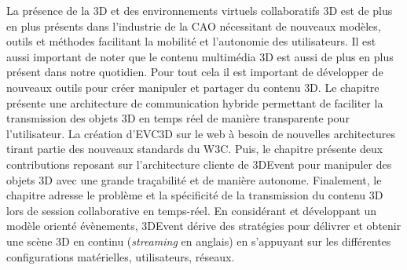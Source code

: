 La présence de la \gls{3D} et des environnements virtuels collaboratifs \gls{3D} est 
de plus en plus présents dans l'industrie de la \gls{CAO} nécessitant de nouveaux 
modèles, outils et méthodes facilitant la mobilité et l'autonomie des utilisateurs. Il 
est aussi important de noter que le contenu multimédia \gls{3D} est aussi de plus 
en plus présent dans notre quotidien. Pour tout cela il est important de développer 
de nouveaux outils pour créer manipuler et partager du contenu \gls{3D}.
Le chapitre  présente une architecture de communication hybride 
permettant de faciliter la transmission des objets \gls{3D} en temps réel de 
manière transparente pour l'utilisateur. La création d'\gls{EVC3D} sur le web à 
besoin de nouvelles architectures tirant partie des nouveaux standards du 
\gls{W3C}. Puis, le chapitre  présente deux  contributions reposant sur l'architecture cliente de 3DEvent pour 
manipuler des objets \gls{3D} avec une grande traçabilité et de manière autonome. 
Finalement, le chapitre adresse le problème et la spécificité de 
la transmission du contenu \gls{3D} lors de session collaborative en temps-réel. 
En considérant et développant un modèle orienté évènements, 3DEvent dérive 
des 
stratégies pour délivrer et obtenir une scène 3D en continu (\textit{streaming} en 
anglais) en s'appuyant sur les différentes configurations matérielles, utilisateurs, 
réseaux.